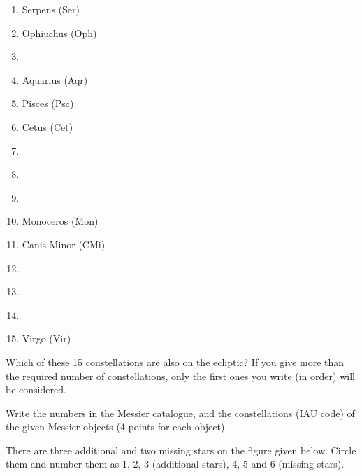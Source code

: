 \begin{enumerate}
\item Serpens (Ser)
\item Ophiuchus (Oph)
\item \underline{\hspace{6em}}
\item Aquarius (Aqr)
\item Pisces (Psc)
\item Cetus (Cet)
\item \underline{\hspace{6em}}
\item \underline{\hspace{6em}}
\item \underline{\hspace{6em}}
\item Monoceros (Mon)
\item Canis Minor (CMi)
\item \underline{\hspace{6em}}
\item \underline{\hspace{6em}}
\item \underline{\hspace{6em}}
\item Virgo (Vir)
\end{enumerate}

Which of these 15 constellations are also on the ecliptic? If you give more
than the required number of constellations, only the first ones you write (in
order) will be considered.

Write the numbers in the Messier catalogue, and the constellations (IAU code)
of the given Messier objects (4 points for each object).


There are three additional and two missing stars on the figure given below.
Circle them and number them as 1, 2, 3 (additional stars), 4, 5 and 6 (missing
stars).

